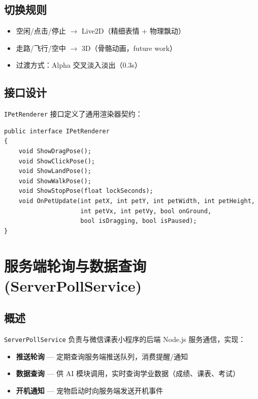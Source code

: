 \documentclass[12pt,a4paper]{ctexart}
\begin{document}
\subsection{切换规则}

\begin{itemize}
    \item 空闲/点击/停止 $\to$ Live2D（精细表情 + 物理飘动）
    \item 走路/飞行/空中 $\to$ 3D（骨骼动画，future work）
    \item 过渡方式：Alpha 交叉淡入淡出（0.3s）
\end{itemize}

\subsection{接口设计}

\texttt{IPetRenderer} 接口定义了通用渲染器契约：

\begin{lstlisting}[style=csharp,caption={IPetRenderer 接口},label={lst:ipet}]
public interface IPetRenderer
{
    void ShowDragPose();
    void ShowClickPose();
    void ShowLandPose();
    void ShowWalkPose();
    void ShowStopPose(float lockSeconds);
    void OnPetUpdate(int petX, int petY, int petWidth, int petHeight,
                     int petVx, int petVy, bool onGround,
                     bool isDragging, bool isPaused);
}
\end{lstlisting}

\section{服务端轮询与数据查询 (ServerPollService)}

\subsection{概述}

\texttt{ServerPollService} 负责与微信课表小程序的后端 Node.js 服务通信，实现：
\begin{itemize}
    \item \textbf{推送轮询} — 定期查询服务端推送队列，消费提醒/通知
    \item \textbf{数据查询} — 供 AI 模块调用，实时查询学业数据（成绩、课表、考试）
    \item \textbf{开机通知} — 宠物启动时向服务端发送开机事件
\end{itemize}
\end{document}
